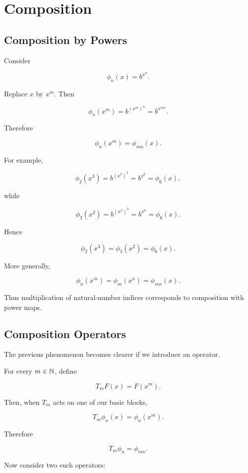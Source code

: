 
\chapter{Composition}

\section{Composition by Powers}

Consider

\[
\phi_n(x)=b^{x^n}.
\]

Replace \(x\) by \(x^m\). Then

\[
\phi_n(x^m)
=
b^{(x^m)^n}
=
b^{x^{mn}}.
\]

Therefore

\[
\boxed{
\phi_n(x^m)=\phi_{mn}(x).
}
\]

For example,

\[
\phi_2(x^3)
=
b^{(x^3)^2}
=
b^{x^6}
=
\phi_6(x),
\]

while

\[
\phi_3(x^2)
=
b^{(x^2)^3}
=
b^{x^6}
=
\phi_6(x).
\]

Hence

\[
\boxed{
\phi_2(x^3)
=
\phi_3(x^2)
=
\phi_6(x).
}
\]

More generally,

\[
\boxed{
\phi_n(x^m)
=
\phi_m(x^n)
=
\phi_{mn}(x).
}
\]

Thus multiplication of natural-number indices corresponds to
composition with power maps.

\section{Composition Operators}

The previous phenomenon becomes clearer if we introduce an operator.

For every \(m\in\mathbb{N}\), define

\[
\boxed{
T_mF(x)=F(x^m).
}
\]

Then, when \(T_m\) acts on one of our basic blocks,

\[
T_m\phi_n(x)
=
\phi_n(x^m).
\]

Therefore

\[
\boxed{
T_m\phi_n=\phi_{mn}.
}
\]

Now consider two such operators:

